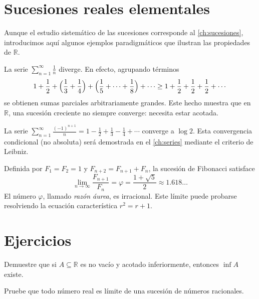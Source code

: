 \section{Sucesiones reales elementales}

Aunque el estudio sistemático de las sucesiones corresponde al \cref{ch:sucesiones}, introducimos aquí algunos ejemplos paradigmáticos que ilustran las propiedades de $\mathbb{R}$.

\begin{example}
La serie $\sum_{n=1}^{\infty}\frac{1}{n}$ diverge. En efecto, agrupando términos
\[
  1+\frac{1}{2}+\Bigl(\frac{1}{3}+\frac{1}{4}\Bigr)+\Bigl(\frac{1}{5}+\cdots+\frac{1}{8}\Bigr)+\cdots
  \geq 1+\frac{1}{2}+\frac{1}{2}+\frac{1}{2}+\cdots
\]
se obtienen sumas parciales arbitrariamente grandes. Este hecho muestra que en $\mathbb{R}$, una sucesión creciente no siempre converge: necesita estar acotada.
\end{example}

\begin{example}
La serie $\sum_{n=1}^{\infty}\frac{(-1)^{n+1}}{n}=1-\frac{1}{2}+\frac{1}{3}-\frac{1}{4}+\cdots$ converge a $\log 2$. Esta convergencia condicional (no absoluta) será demostrada en el \cref{ch:series} mediante el criterio de Leibniz.
\end{example}

\begin{example}
Definida por $F_1=F_2=1$ y $F_{n+2}=F_{n+1}+F_n$, la sucesión de Fibonacci satisface
\[
  \lim_{n\to\infty}\frac{F_{n+1}}{F_n}=\varphi=\frac{1+\sqrt{5}}{2}\approx 1.618\dots
\]
El número $\varphi$, llamado \emph{razón áurea}, es irracional. Este límite puede probarse resolviendo la ecuación característica $r^2=r+1$.
\end{example}

\section{Ejercicios}

\begin{exercise}
Demuestre que si $A\subseteq\mathbb{R}$ es no vacío y acotado inferiormente, entonces $\inf A$ existe.
\end{exercise}

\begin{exercise}
Pruebe que todo número real es límite de una sucesión de números racionales.
\end{exercise}

